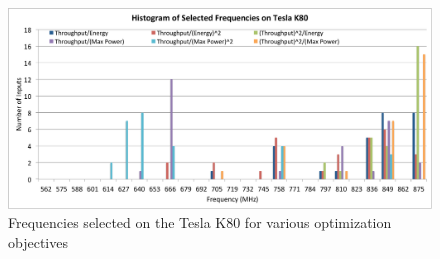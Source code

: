 \begin{figure}[tb]
   \centering
   \includegraphics[scale=0.4]{figs/histo_k80.pdf}
   \caption{Frequencies selected on the Tesla K80 for various optimization objectives}
   \label{fig:histo-k80}
\end{figure}




